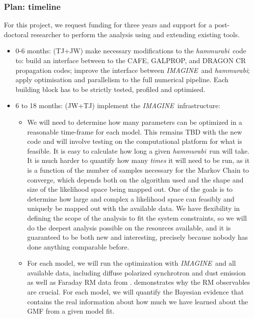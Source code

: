 \documentclass[12pt]{article}
\newcommand{\imagineSW}{\textsl{IMAGINE}}
\newcommand{\hammurabi}{\textsl{hammurabi}}
\begin{document}
\subsubsection*{Plan:  timeline}\label{sec:outline}

For this project, we request funding for three years and support for
a post-doctoral researcher to perform the analysis using
and extending existing tools. 

\begin{itemize}

\item 0-6 months: (TJ+JW) make necessary modifications to the \hammurabi\ code to:   build an interface between to the CAFE, GALPROP, and DRAGON CR propagation codes;  improve the interface between \imagineSW\ and \hammurabi;  apply optimisation and parallelism to the full numerical pipeline. 
Each building block has to be strictly tested, profiled and optimised.

\item 6 to 18 months: (JW+TJ) implement the \imagineSW\
  infrastructure:   

\begin{itemize}


\item We will need to determine how many parameters can be
  optimized in a reasonable time-frame for each model.  This remains
  TBD with the new code and will involve testing on the computational
  platform for what is feasible. It is easy to calculate how long a
  given \hammurabi\ run will take. It is much harder to quantify how
  many {\it times} it will need to be run, as it is a function of the
  number of samples necessary for the Markov Chain to converge, which depends
  both on the algorithm used and the shape and size of the likelihood
  space being mapped out. One of the goals is to determine how large and complex a likelihood space can feasibly and uniquely be mapped out with the available data. We have flexibility in defining the scope of
  the analysis to fit the system constraints, so we will do the deepest analysis possible on the resources available, and
  it is guaranteed to be both new and interesting, precisely because
  nobody has done anything comparable before.

\item For each model, we will run the optimization with \imagineSW\ and all
  available data, including diffuse polarized synchrotron and dust emission as well as 
  Faraday RM data from
  \citet{oppermann:2012b}. \citealt{jaffe10} demonstrates why the
  RM observables are crucial.  For each model, we will quantify the Bayesian evidence that
  contains the real information about how much we have learned about
  the GMF from a given model fit. 



\end{itemize}
\end{itemize}
\end{document}
